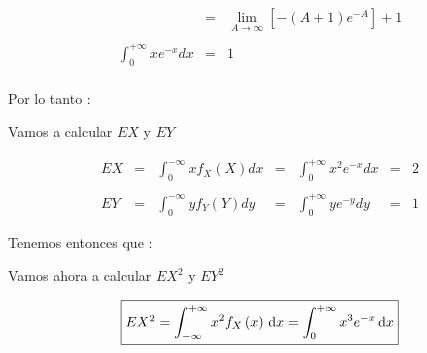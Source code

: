 \documentclass[12pt]{article}
\begin{document}
\begin{center}
\begin{equation*}
\begin{array}{c|c}
\begin{array}{l}
\begin{array}{rcl}
                        \\
                        \\
                        & = & \displaystyle\lim_{A\to\infty} \left[-\left(A+1\right)e^{-A}\right] +1 
                        \\
                        \\
                        \int_{0}^{+\infty}xe^{-x}dx & = & 1
                    \end{array}
                \end{array}
            \end{array}
        \end{equation*}
    \end{center}
    
    \begin{flushleft}
        Por lo tanto :  
    \end{flushleft}
   
    \begin{flushleft}
        Vamos a calcular  $EX$   y $EY$
    \end{flushleft}
         
    \begin{equation*}
        \begin{array}{rcccccl}
            EX & = & \displaystyle \int_{0}^{-\infty}x f_{X}(X)dx & = & \displaystyle \int_{0}^{+\infty}x^{2}e^{-x}dx & = & 2
            \\
            \\
            EY & = &\displaystyle \int_{0}^{-\infty}y f_{Y}(Y)dy & = & \displaystyle \int_{0}^{+\infty}ye^{-y}dy & = & 1
        \end{array}
    \end{equation*}

    \begin{flushleft}
        Tenemos entonces que : \hspace{1cm} 
    \end{flushleft}

    \vspace{0.5cm} 

    \begin{flushleft}
        Vamos ahora a calcular $EX^2 $ y $EY^2$  
    \end{flushleft}

    \begin{equation*}
        \fbox{$
            EX^2 = \displaystyle \int_{-\infty}^{+\infty}  x^2 f_{X}\left(x\right) \,\mathrm{d}x  = \displaystyle \int_{0}^{+\infty}  x^3 e^{-x} \,\mathrm{d}x
        $}
    \end{equation*}
\end{document}
